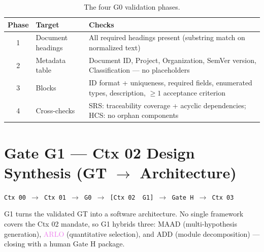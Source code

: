 \documentclass[11pt,a4paper]{article}
\begin{document}
\begin{table}[htbp]
\centering
\caption{The four G0 validation phases.}
\label{tab:g0phases}
\small
\setlength{\tabcolsep}{5pt}
\begin{tabular}{@{}clp{8.6cm}@{}}
\toprule
\textbf{Phase} & \textbf{Target} & \textbf{Checks} \\
\midrule
1 & Document headings & All required headings present (substring match on normalized text) \\
2 & Metadata table & Document ID, Project, Organization, SemVer version, Classification --- no placeholders \\
3 & Blocks & ID format + uniqueness, required fields, enumerated types, description, $\geq 1$ acceptance criterion \\
4 & Cross-checks & SRS: traceability coverage + acyclic dependencies; HCS: no orphan components \\
\bottomrule
\end{tabular}
\end{table}

\section{Gate G1 --- Ctx 02 Design Synthesis (GT $\to$ Architecture)}

\begin{center}\footnotesize
\texttt{Ctx 00 $\to$ Ctx 01 $\to$ G0 \checkmark $\to$ [Ctx 02 \textbullet\ G1]
$\to$ Gate H $\to$ Ctx 03}
\end{center}

\vspace{-2pt}

G1 turns the validated GT into a software architecture. No single framework covers the Ctx 02
mandate, so G1 hybrids three: \textcolor{zzblue}{MAAD} (multi-hypothesis generation),
\textcolor{violet}{ARLO} (quantitative selection), and \textcolor{vteal}{ADD} (module
decomposition) --- closing with a human Gate H package.
\end{document}
